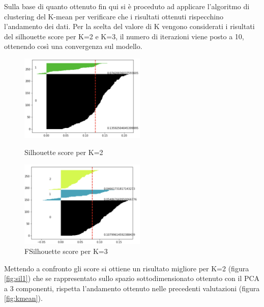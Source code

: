 Sulla base di quanto ottenuto fin qui si è proceduto ad applicare l'algoritmo di clustering del K-mean per verificare che i risultati ottenuti rispecchino l'andamento dei dati.
Per la scelta del valore di K vengono considerati i risultati del silhouette score per K=2 e K=3, il numero di iterazioni viene posto a 10, ottenendo così una convergenza sul modello.
\begin{figure}  
	\begin{minipage}{0.5\textwidth} 
		\centering
		\includegraphics[width=6cm]{capitolo3/sil2.png}
		\caption{Silhouette score per K=2}
		\label{fig:sil1}  
	\end{minipage}    
	\hspace{\fill}  %
	\begin{minipage}{0.5\textwidth} 
		\centering
		\includegraphics[width=6cm]{capitolo3/sil3.png}
		\caption{FSilhouette score per K=3}
		\label{fig:sil2}  
	\end{minipage}    
\end{figure}

Mettendo a confronto gli score si ottiene un risultato migliore per K=2 (figura \ref{fig:sil1}) che se rappresentato sullo spazio sottodimensionato ottenuto con il PCA a 3 componenti, rispetta l'andamento ottenuto nelle precedenti valutazioni (figura \ref{fig:kmean}).


